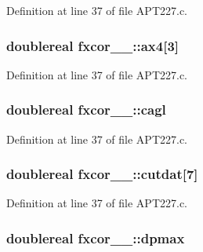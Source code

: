 Definition at line 37 of file A\+P\+T227.\+c.

\subsubsection[{\texorpdfstring{ax4}{ax4}}]{\setlength{\rightskip}{0pt plus 5cm}doublereal fxcor\+\_\+\_\+\+::ax4\mbox{[}3\mbox{]}}\hypertarget{structfxcor__1___ae0c7825286b71aa462d610edfc95371d}{}\label{structfxcor__1___ae0c7825286b71aa462d610edfc95371d}


Definition at line 37 of file A\+P\+T227.\+c.

\subsubsection[{\texorpdfstring{cagl}{cagl}}]{\setlength{\rightskip}{0pt plus 5cm}doublereal fxcor\+\_\+\_\+\+::cagl}\hypertarget{structfxcor__1___aff52d4af2a4494e3bf16b35cf876797f}{}\label{structfxcor__1___aff52d4af2a4494e3bf16b35cf876797f}


Definition at line 37 of file A\+P\+T227.\+c.

\subsubsection[{\texorpdfstring{cutdat}{cutdat}}]{\setlength{\rightskip}{0pt plus 5cm}doublereal fxcor\+\_\+\_\+\+::cutdat\mbox{[}7\mbox{]}}\hypertarget{structfxcor__1___a1f7f6fa2eb591e8374ae2d33348c182a}{}\label{structfxcor__1___a1f7f6fa2eb591e8374ae2d33348c182a}


Definition at line 37 of file A\+P\+T227.\+c.

\subsubsection[{\texorpdfstring{dpmax}{dpmax}}]{\setlength{\rightskip}{0pt plus 5cm}doublereal fxcor\+\_\+\_\+\+::dpmax}\hypertarget{structfxcor__1___a30506e623dc25d4b11ebef787b8f349d}{}\label{structfxcor__1___a30506e623dc25d4b11ebef787b8f349d}


